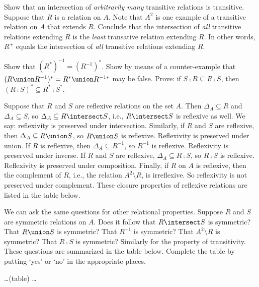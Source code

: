 \begin{Exercise} [number=48,difficulty=1]
  \Question Show that an intersection of \emph{arbitrarily many} transitive
  relations is transitive.
  \Question Suppose that $R$ is a relation on $A$. Note that $A^2$ is
  one example of a transitive relation on $A$ that extends
  $R$. Conclude that the intersection of \emph{all} transitive relations
  extending $R$ is the \emph{least} transative relation extending $R$. In
  other words, $R^+$ equals the intersection of \emph{all} transitive
  relations extending $R$.
\end{Exercise}

\begin{Exercise} [difficulty=1,number=49]
  \Question Show that $(R^*)^{-1} = (R^{-1})^*$.
  \Question Show by means of a counter-example that $(R \union
  R^{-1})^* = R^* \union R^{-1*}$ may be false.
  \Question Prove: if $S \comp R \subseteq R \comp S$, then $(R \comp
  S)^* \subseteq R^* \comp S^*$.
\end{Exercise}

\begin{Exercise} [number=50]
  Suppose that $R$ and $S$ are reflexive relations on the set
  $A$. Then $\Delta_A \subseteq R$ and $\Delta_A \subseteq S$, so
  $\Delta_A \subseteq R \intersect S$, i.e., $R \intersect S$ is
  reflexive as well. We say: reflexivity is preserved under
  intersection. Similarly, if $R$ and $S$ are reflexive, then
  $\Delta_A \subseteq R \union S$, so $R \union S$ is
  reflexive. Reflexivity is preserved under union. If $R$ is
  reflexive, then $\Delta_A \subseteq R^{-1}$, so $R^{-1}$ is
  reflexive. Reflexivity is preserved under inverse. If $R$ and $S$
  are reflexive, $\Delta_A \subseteq R \comp S$, so $R \comp S$ is
  reflexive. Reflexivity is preserved under composition. Finally, if
  $R$ on $A$ is reflexive, then the complement of $R$, i.e., the
  relation $A^2 \setminus R$, is irreflexive. So reflexivity is not
  preserved under complement. These closure properties of reflexive
  relations are listed in the table below.

  We can ask the same questions for other relational
  properties. Suppose $R$ and $S$ are symmetric relations on $A$. Does
  it follow that $R \intersect S$ is symmetric? That $R \union S$ is
  symmetric? That $R^{-1}$ is symmetric? That $A^2 \setminus R$ is
  symmetric? That $R \comp S$ is symmetric? Similarly for the property
  of transitivity. These questions are summarized in the table
  below. Complete the table by putting `yes' or `no' in the
  appropriate places.

  \dots (table) \dots
\end{Exercise}

